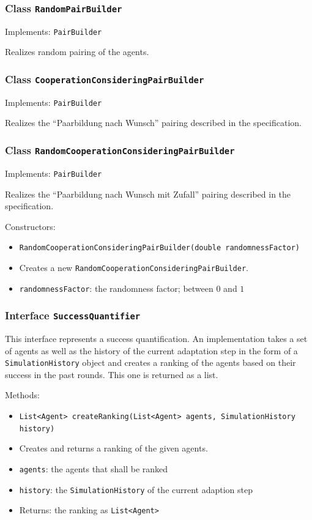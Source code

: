 \documentclass[parskip=full,11pt]{scrartcl}
\begin{document}
\subsubsection{Class \texttt{RandomPairBuilder}}
Implements: \texttt{PairBuilder}

Realizes random pairing of the agents.

\subsubsection{Class \texttt{CooperationConsideringPairBuilder}}
Implements: \texttt{PairBuilder}

Realizes the \enquote{Paarbildung nach Wunsch} pairing described in the specification.

\subsubsection{Class \texttt{RandomCooperationConsideringPairBuilder}}
Implements: \texttt{PairBuilder}

Realizes the \enquote{Paarbildung nach Wunsch mit Zufall} pairing described in the specification.


Constructors:
\begin{itemize}\itemsep -10pt
\item \texttt{RandomCooperationConsideringPairBuilder(double randomnessFactor)}
\item[] Creates a new \texttt{RandomCooperationConsideringPairBuilder}.
\item[] \texttt{randomnessFactor}: the randomness factor; between \(0\) and \(1\)
\end{itemize}

\subsubsection{Interface \texttt{SuccessQuantifier}}

This interface represents a success quantification. An implementation takes a set of agents as well as the history of the current adaptation step in the form of a \texttt{SimulationHistory} object and creates a ranking of the agents based on their success in the past rounds. This one is returned as a list.

Methods:
\begin{itemize}\itemsep -10pt
\item \texttt{List<Agent> createRanking(List<Agent> agents, SimulationHistory history)}
\item[] Creates and returns a ranking of the given agents.
\item[] \texttt{agents}: the agents that shall be ranked
\item[] \texttt{history}: the \texttt{SimulationHistory} of the current adaption step
\item[] Returns: the ranking as \texttt{List<Agent>}
\end{itemize}
\end{document}
